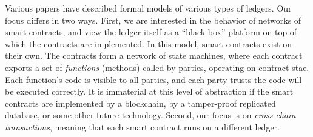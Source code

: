 Various papers have described formal models of various types of ledgers.
Our focus differs in two ways. 
First, we are interested in the behavior of networks of smart contracts,
and view the ledger itself as a ``black box'' platform on top of which the contracts
are implemented.  
In this model, 
smart contracts exist on their own.
The contracts form a network of state machines,
where each contract exports a set of \emph{functions} (methods) called by parties,
operating on contract stae.
Each function's code is visible to all parties, and each party trusts the code will be executed correctly.
It is immaterial at this level of abstraction
if the smart contracts are implemented by a blockchain,
by a tamper-proof replicated database,
or some other future technology.
Second, our focus is on \emph{cross-chain transactions}, meaning that each smart contract runs on a different ledger.

